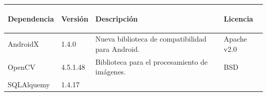 \begin{longtable}[]{@{}llll@{}} 
\toprule \label{librarylicensetable}
\begin{minipage}[b]{0.18\columnwidth}\raggedright\strut
Dependencia\strut
\end{minipage} & \begin{minipage}[b]{0.10\columnwidth}\raggedright\strut
Versión\strut
\end{minipage} & \begin{minipage}[b]{0.49\columnwidth}\raggedright\strut
Descripción\strut
\end{minipage} & \begin{minipage}[b]{0.11\columnwidth}\raggedright\strut
Licencia\strut
\end{minipage}\tabularnewline
\midrule
\endhead
\begin{minipage}[t]{0.18\columnwidth}\raggedright\strut
AndroidX\strut
\end{minipage} & \begin{minipage}[t]{0.08\columnwidth}\raggedright\strut
1.4.0\strut
\end{minipage} & \begin{minipage}[t]{0.49\columnwidth}\raggedright\strut
Nueva biblioteca de compatibilidad para Android.\strut
\end{minipage} & \begin{minipage}[t]{0.11\columnwidth}\raggedright\strut
Apache v2.0\strut
\end{minipage}\tabularnewline
\begin{minipage}[t]{0.18\columnwidth}\raggedright\strut
OpenCV\strut
\end{minipage} & \begin{minipage}[t]{0.08\columnwidth}\raggedright\strut
4.5.1.48\strut
\end{minipage} & \begin{minipage}[t]{0.49\columnwidth}\raggedright\strut
Biblioteca para el procesamiento de imágenes.\strut
\end{minipage} & \begin{minipage}[t]{0.11\columnwidth}\raggedright\strut
BSD\strut
\end{minipage}\tabularnewline
\begin{minipage}[t]{0.18\columnwidth}\raggedright\strut
SQLAlquemy\strut
\end{minipage} & \begin{minipage}[t]{0.08\columnwidth}\raggedright\strut
1.4.17\strut
\end{minipage} & \begin{minipage}[t]{0.49\columnwidth}\raggedright\strut

\end{minipage}
\end{longtable}
